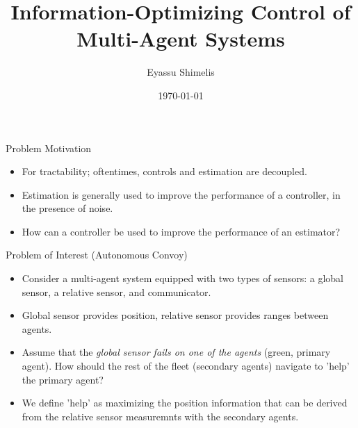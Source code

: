 \documentclass[9pt]{beamer}
\title{Information-Optimizing Control of Multi-Agent Systems}
\author{Eyassu Shimelis}
\date{\today}
\begin{document}

\frame{\titlepage}

\begin{frame}{Problem Motivation}

\begin{itemize}
  \item For tractability; oftentimes, controls and estimation are decoupled.
  \item Estimation is generally used to improve the performance of a controller, in the presence of noise.
  \item How can a controller be used to improve the performance of an estimator?
\end{itemize}
\end{frame}

\begin{frame}[t]{Problem of Interest (Autonomous Convoy)}
\begin{itemize}
  \item Consider a multi-agent system equipped with two types of sensors: a global sensor, a relative sensor, and communicator.
  \item Global sensor provides position, relative sensor provides ranges between agents.
  \item Assume that the {\emph{global sensor fails on one of the agents}} (green, primary agent). How should the rest of the fleet (secondary agents) navigate to 'help' the primary agent?
  \item We define 'help' as maximizing the position information that can be derived from the relative sensor measuremnts with the secondary agents.

\end{itemize}

\begin{center}
\end{center}
\end{frame}
\end{document}

